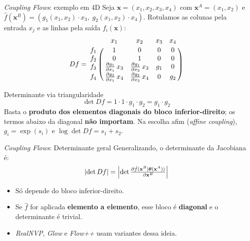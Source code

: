 \documentclass[aspectratio=169,xcolor=dvipsnames]{beamer}
\begin{document}
  \begin{frame}{\textit{Coupling Flows}: exemplo em 4D}
    Seja $\mathbf{x} = (x_1, x_2, x_3, x_4)$ com $\mathbf{x}^{A}=(x_1,x_2)$ e
    $\hat{f}(\mathbf{x}^{B}) = (g_1(x_1,x_2)\cdot x_3,\; g_2(x_1,x_2)\cdot x_4)$. Rotulamos as
    colunas pela entrada $x_j$ e as linhas pela saída $f_i(\mathbf{x})$:
    \vspace{-0.2em}
    \[
      Df =
      \bordermatrix{
        & x_1 & x_2 & x_3 & x_4 \cr
        f_1 & 1 & 0 & 0 & 0 \cr
        f_2 & 0 & 1 & 0 & 0 \cr
        f_3 & \tfrac{\partial g_1}{\partial x_1}\,x_3 & \tfrac{\partial g_1}{\partial x_2}\,x_3 & g_1 & 0 \cr
        f_4 & \tfrac{\partial g_2}{\partial x_1}\,x_4 & \tfrac{\partial g_2}{\partial x_2}\,x_4 & 0 & g_2 \cr
      }
    \]
    \vspace{-0.2em}
    \begin{block}{Determinante via triangularidade}
      \[
        \det Df = 1 \cdot 1 \cdot g_1 \cdot g_2 = g_1 \cdot g_2
      \]
      Basta o \textbf{produto dos elementos diagonais do bloco
      inferior-direito}; os termos abaixo da diagonal \textbf{não importam}.
      Na escolha afim (\textit{affine coupling}), $g_i = \exp(s_i)$ e
      $\log\det Df = s_1 + s_2$.
    \end{block}
  \end{frame}

  \begin{frame}{\textit{Coupling Flows}: Determinante geral}
    Generalizando, o determinante da Jacobiana é:
    \vspace{0.3em}
    \[
      \left|\det Df\right| =
      \left|\det \tfrac{\partial \hat{f}(\mathbf{x}^{B} \mid \bm{\theta}(\mathbf{x}^{A}))}{\partial \mathbf{x}^{B}}\right|
    \]
    \vspace{0.3em}
    \begin{itemize}
      \item Só depende do bloco inferior-direito.
      \item Se $\hat{f}$ for aplicada \textbf{elemento a elemento},
      esse bloco é \textbf{diagonal} e o determinante é trivial.
      \item \textit{RealNVP}, \textit{Glow} e \textit{Flow++} usam
      variantes dessa ideia.
    \end{itemize}
  \end{frame}
\end{document}
